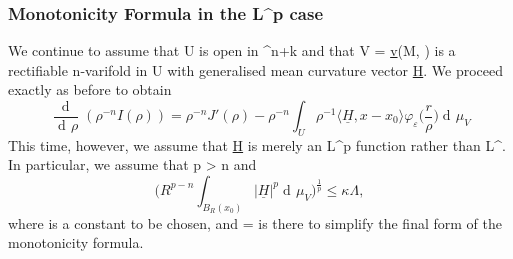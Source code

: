 \documentclass[a4paper, 11pt]{article}
\theoremstyle{plain}
\theoremstyle{definition}
\theoremstyle{remark}
\DeclareMathOperator{\diff}{d \!}
\numberwithin{equation}{subsection}
\def\({}
\def\){}
\begin{document}
\subsubsection{Monotonicity Formula in the \texorpdfstring{\(L^p\)}{Lp} case}

We continue to assume that \(U\) is open in \(^{n+k}\) and that \(V = \underline{v}(M, \theta)\) is a rectifiable \(n\)-varifold in \(U\) with generalised mean curvature vector \(\underline{H}\). We proceed exactly as before to obtain
\begin{equation}
\label{monotonicity_Lp_1}
\frac{\!\diff}{\diff\rho}(\rho^{-n}I(\rho)) = \rho^{-n}J'(\rho) - \rho^{-n}\int_{U}\rho^{-1} \langle \underline{H}, x - x_{0}\rangle \varphi_{\varepsilon}\biggl(\frac{r}{\rho}\biggr)\diff\mu_V
\end{equation}
This time, however, we assume that \(\underline{H}\) is merely an \(L^p\) function rather than \(L^{\infty}\). In particular, we assume that \(p > n\) and
\begin{equation}
\biggl(R^{p-n}\int_{B_R(x_0)}|\underline{H}|^p \diff\mu_V\biggr)^{\frac{1}{p}} \leqslant \kappa\Lambda,
\end{equation}
where \(\Lambda\) is a constant to be chosen, and \(\kappa = \) is there to simplify the final form of the monotonicity formula.
\end{document}
